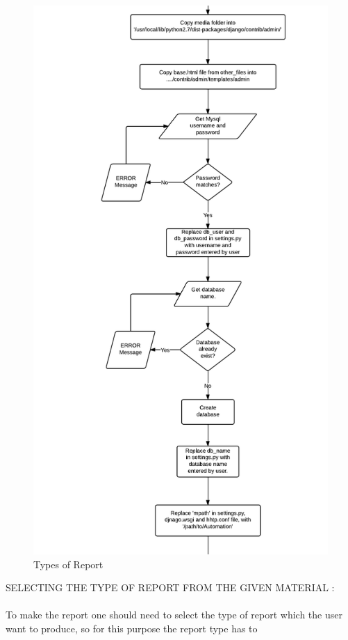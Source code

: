 \begin{figure}[h]
\centering \includegraphics[scale=1.0]{images/inst3.png}
\caption{Types of Report}
\end{figure}
SELECTING THE TYPE OF REPORT FROM THE GIVEN MATERIAL :\\\\
To make the report one should need to select the type of report which 
the user want to produce, so for this purpose the report type has to 
